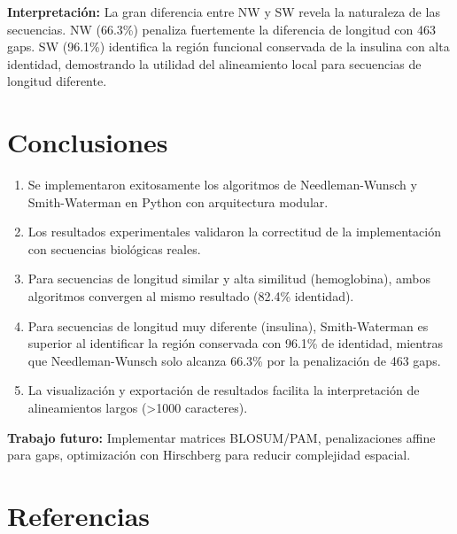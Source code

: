 \documentclass[12pt,a4paper]{article}
\begin{document}
\textbf{Interpretación:} La gran diferencia entre NW y SW revela la naturaleza de las secuencias. NW (66.3\%) penaliza fuertemente la diferencia de longitud con 463 gaps. SW (96.1\%) identifica la región funcional conservada de la insulina con alta identidad, demostrando la utilidad del alineamiento local para secuencias de longitud diferente.

\section{Conclusiones}

\begin{enumerate}
    \item Se implementaron exitosamente los algoritmos de Needleman-Wunsch y Smith-Waterman en Python con arquitectura modular.
    
    \item Los resultados experimentales validaron la correctitud de la implementación con secuencias biológicas reales.
    
    \item Para secuencias de longitud similar y alta similitud (hemoglobina), ambos algoritmos convergen al mismo resultado (82.4\% identidad).
    
    \item Para secuencias de longitud muy diferente (insulina), Smith-Waterman es superior al identificar la región conservada con 96.1\% de identidad, mientras que Needleman-Wunsch solo alcanza 66.3\% por la penalización de 463 gaps.
    
    \item La visualización y exportación de resultados facilita la interpretación de alineamientos largos (>1000 caracteres).
\end{enumerate}

\textbf{Trabajo futuro:} Implementar matrices BLOSUM/PAM, penalizaciones affine para gaps, optimización con Hirschberg para reducir complejidad espacial.

\vspace{1cm}

\newpage
\section*{Referencias}
\end{document}
